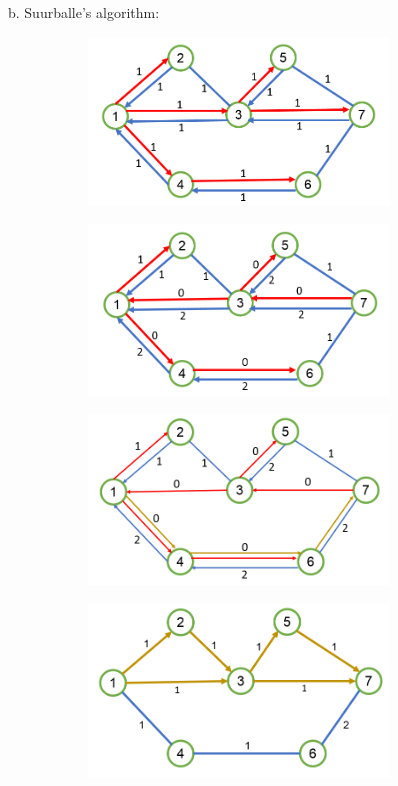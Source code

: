 \documentclass[10pt,letterpaper]{article}
\begin{document}
\newpage
b. Suurballe's algorithm:
\begin{figure}[h!]
\centering
\begin{subfigure}{0.49\textwidth}
\includegraphics[width=80mm]{PSol6_Q5_5.png}
\end{subfigure}
\begin{subfigure}{0.49\textwidth}
\includegraphics[width=80mm]{PSol6_Q5_6.png}
\end{subfigure}
\begin{subfigure}{0.49\textwidth}
\includegraphics[width=80mm]{PSol6_Q5_7.png}
\end{subfigure}
\begin{subfigure}{0.49\textwidth}
\includegraphics[width=80mm]{PSol6_Q5_4.png}
\end{subfigure}
\end{figure}
\end{document}
